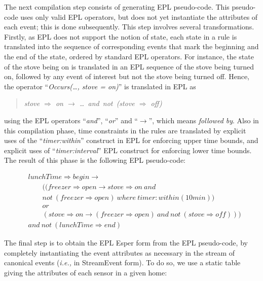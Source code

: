 The next compilation step consists of generating EPL pseudo-code. This pseudo-code uses only valid EPL operators, but does not yet instantiate the attributes of each event; this is done subsequently.  This step involves several transformations.  Firstly, as EPL does not support the notion of state, each state in a rule is translated into the sequence of corresponding events that mark the beginning and the end of the state, ordered by standard EPL operators. For instance, the state of the stove being on is translated in an EPL sequence of the stove being turned on, followed by any event of interest but not the stove being turned off. Hence, the operator ``{\em Occurs(\dots, stove = on)}'' is translated in EPL as 
\begin{quote} {\em stove $\Rightarrow$ on $\rightarrow$ \dots\ and\ not\ (stove $\Rightarrow$ off)} \end{quote}
\noindent 
using the EPL operators ``{\em and}'', ``{\em or}'' and ``$\rightarrow$'', which means {\em followed by}.  Also in this compilation phase, time constraints in the rules are translated by explicit uses of the ``{\em timer:within}'' construct in EPL for enforcing upper time bounds, and explicit uses of ``{\em timer:interval}'' EPL construct for enforcing lower time bounds.  The result of this phase is the following EPL pseudo-code:

\footnotesize
\begin{equation*}
  \begin{split}
&lunchTime\Rightarrow begin \rightarrow\\
&\quad\quad ( ( freezer\Rightarrow open \rightarrow  stove\Rightarrow on\ and\\ 
&\quad\quad not\ ( freezer\Rightarrow open )\ where\ timer:within(10min) )\\ 
&\quad\quad or\\  
&\quad\quad ( stove\Rightarrow on \rightarrow  ( freezer\Rightarrow open )\ and\ not\ ( stove\Rightarrow off ) ) )  \\
&and\ not\ ( lunchTime\Rightarrow end )
  \end{split}
\end{equation*}
\normalsize

The final step is to obtain the EPL Esper form from the EPL pseudo-code, by completely instantiating the event attributes as necessary in the stream of canonical events ({\em i.e.,} in StreamEvent form). To do so, we use a static table giving the attributes of each sensor in a given home:

